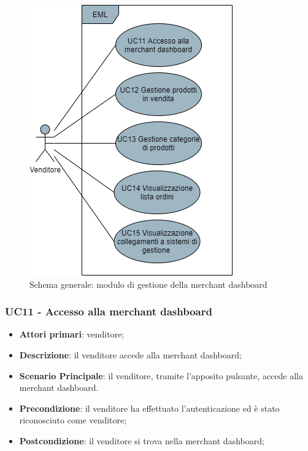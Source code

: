 \begin{figure}[H]
\centering
\includegraphics[scale=0.6]{res/UseCase/Immagini/MerchantDashboard}
\caption{Schema generale: modulo di gestione della merchant dashboard}
\end{figure}

\subsubsection{UC11 - Accesso alla merchant dashboard}
\begin{itemize}
\item \textbf{Attori primari}: venditore;
\item \textbf{Descrizione}: il venditore accede alla merchant dashboard;
\item \textbf{Scenario Principale}: il venditore, tramite l'apposito pulsante, accede alla merchant dashboard.
\item \textbf{Precondizione}: il venditore ha effettuato l'autenticazione ed è stato riconosciuto come venditore;
\item \textbf{Postcondizione}: il venditore si trova nella merchant dashboard;
\end{itemize}

